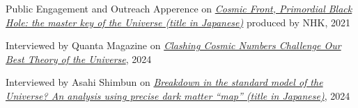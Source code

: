 \begin{rSection}{Public Engagement and Outreach}
  Apperence on \href{https://www.nhk-ondemand.jp/goods/G2021114366SA000/}{\textit{Cosmic Front, Primordial Black Hole: the master key of the Universe (title in Japanese)}} produced by NHK, 2021

  Interviewed by Quanta Magazine on \href{https://www.quantamagazine.org/clashing-cosmic-numbers-challenge-our-best-theory-of-the-universe-20240119/}{\textit{Clashing Cosmic Numbers Challenge Our Best Theory of the Universe}}, 2024
  
  Interviewed by Asahi Shimbun on \href{https://www.asahi.com/articles/ASR4H415RR48ULBH001.html}{\textit{Breakdown in the standard model of the Universe? An analysis using precise dark matter ``map'' (title in Japanese)}}, 2024
\end{rSection}
